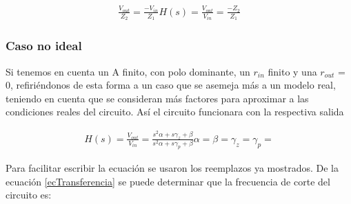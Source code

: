 \begin{align}
	\begin{equation}
		\frac{V_{out}}{Z_2} = \frac{- V_{in}}{Z_1}
	\end{equation}
	
	\begin{equation}
		H(s)=\frac{V_{out}}{V_{in}} = \frac{-Z_2}{Z_1}
	\end{equation}
	\label{ecTransferenciaIdeal}	
\end{align}


\subsubsection{Caso no ideal}

Si tenemos en cuenta un A finito, con polo dominante, un $r_{in}$ finito y una $r_{out}$ = 0, refiriéndonos de esta forma a un caso que se asemeja más a un modelo real, teniendo en cuenta que se consideran más factores para aproximar a las condiciones reales del circuito. Así el circuito funcionara con la respectiva salida

\begin{align}
	
	\begin{equation}
		H(s)=\frac{V_{out}}{V_{in}} = \frac{s^2 \alpha + s \gamma_z + \beta}{s^2 \alpha + s \gamma_p + \beta}
	\end{equation}
	\label{ecTransferencia}
	
	\begin{equation}
		\alpha= 
	\end{equation}
	
	\begin{equation}
		\beta= 
	\end{equation}
	
	\begin{equation}
		\gamma_z= 
	\end{equation}
	
	\begin{equation}
		\gamma_p= 
	\end{equation}
	
\end{align}


Para facilitar escribir la ecuación se usaron los reemplazos ya mostrados. De la ecuación \ref{ecTransferencia} se puede determinar que la frecuencia de corte del circuito es:


